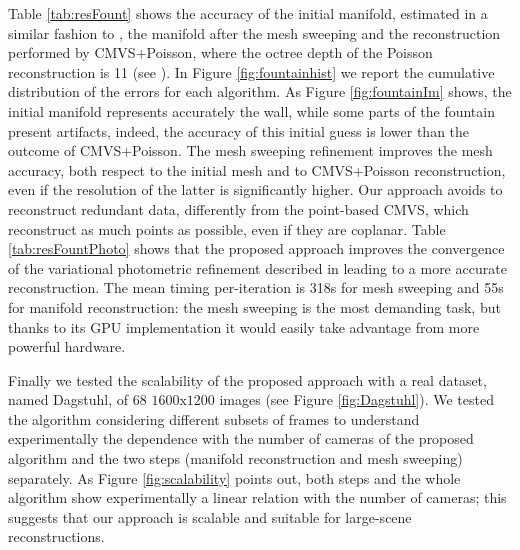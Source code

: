 Table \ref{tab:resFount} shows the accuracy of the initial manifold, estimated in a similar fashion to \cite{romanoni15b}, the manifold after the mesh sweeping and the reconstruction performed by CMVS+Poisson, where the octree depth of the Poisson reconstruction is 11 (see \cite{kazhdan2006poisson}). In Figure \ref{fig:fountainhist} we report the cumulative distribution of the errors for each algorithm.
As Figure \ref{fig:fountainIm} shows, the initial manifold represents accurately the wall, while some parts of the fountain present artifacts, indeed, the accuracy of this initial guess is lower than the outcome of CMVS+Poisson.
The mesh sweeping refinement improves the mesh accuracy, both respect to the initial mesh and to CMVS+Poisson reconstruction, even if the resolution of the latter is significantly higher. Our approach avoids to reconstruct redundant data, differently from the point-based CMVS, which reconstruct as much points as possible, even if they are coplanar.
Table \ref{tab:resFountPhoto} shows that the proposed approach improves the convergence of the variational photometric refinement described in \cite{vu_et_al_2012} leading to a more accurate reconstruction. 
The mean timing per-iteration is 318s for mesh sweeping and 55s for manifold reconstruction: the mesh sweeping is the most demanding task, but thanks to its GPU implementation it would easily take advantage from more powerful hardware.

Finally we tested the scalability of the proposed approach with a real dataset, named Dagstuhl, of 68 $1600\text{x}1200$ images (see Figure \ref{fig:Dagstuhl}). 
We tested the algorithm considering different subsets of frames to understand experimentally the dependence with the number of cameras of the proposed algorithm and the two steps (manifold reconstruction and mesh sweeping) separately. 
As Figure \ref{fig:scalability} points out, both steps and the whole algorithm show experimentally a linear relation with the number of cameras; this suggests that our approach is scalable and suitable for large-scene reconstructions.



